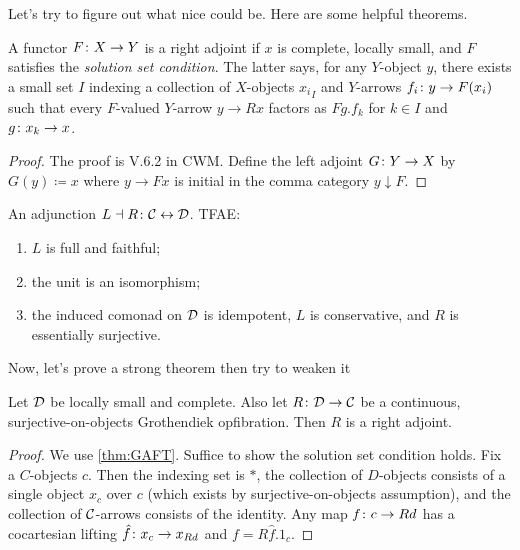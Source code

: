 \documentclass{amsart}
\begin{document}
Let's try to figure out what nice could be. Here are some helpful theorems.

\begin{thm}
\label{thm:GAFT}
	A functor $ F \colon X \to Y $ is a right adjoint if  $ x $ is complete, locally small, and $ F $ satisfies the \emph{solution set condition}. The latter says, for any $ Y $-object $ y $, there exists a small set $ I $ indexing a collection of $ X $-objects $ {x_i}_I $ and $ Y $-arrows $ {f_i \colon y \to F ( x_i ) } $ such that every $ F $-valued $ Y $-arrow $ y \to R x $ factors as $ Fg . f_k $ for $ k \in I $ and $ g \colon x_k \to x $.
\end{thm}

\begin{proof}
	The proof is V.6.2 in CWM.  Define the left adjoint $ G \colon Y \to X $ by $ G (y) \coloneqq x $ where $ y \to F x $ is initial in the comma category $ y \downarrow F $.  
\end{proof}

\begin{thm}
\label{thm:GabZis}
	An adjunction $ L \dashv R \colon \mathcal{C} \leftrightarrow \mathcal{D} $. TFAE:
	\begin{enumerate}
		\item $ L $ is full and faithful;
		\item the unit is an isomorphism;
		\item the induced comonad on $ \mathcal{D} $ is idempotent, $ L $ is conservative, and $ R $ is essentially surjective.
	\end{enumerate}
\end{thm}

Now, let's prove a strong theorem then try to weaken it

\begin{thm}
	Let $ \mathcal{D}$ be locally small and complete. Also let $ R \colon \mathcal{D} \to \mathcal{C} $ be a continuous, surjective-on-objects Grothendiek opfibration.  Then $ R $ is a right adjoint.
\end{thm}

\begin{proof}
	We use \ref{thm:GAFT}.  Suffice to show the solution set condition holds.  Fix a $ C $-objects $ c $.  Then the indexing set is $ \ast $, the collection of $ D $-objects consists of a single object $ x_c $ over $ c $ (which exists by surjective-on-objects assumption), and the collection of $ \mathcal{C} $-arrows consists of the identity.  Any map $ f \colon c \to Rd $ has a cocartesian lifting $ \hat{f} \colon x_c \to x_{Rd} $ and $ f = R \hat{f} . 1_c $.
\end{proof}
\end{document}
